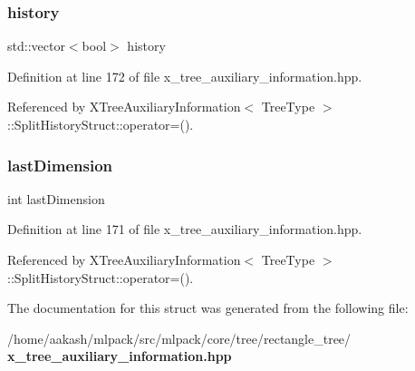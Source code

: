 \subsubsection{history}
{\footnotesize\ttfamily std\+::vector$<$bool$>$ history}



Definition at line 172 of file x\+\_\+tree\+\_\+auxiliary\+\_\+information.\+hpp.



Referenced by X\+Tree\+Auxiliary\+Information$<$ Tree\+Type $>$\+::\+Split\+History\+Struct\+::operator=().

\mbox{\label{structmlpack_1_1tree_1_1XTreeAuxiliaryInformation_1_1SplitHistoryStruct_a6684f26fb0936bb74b60344e7e819b8a}} 
\subsubsection{last\+Dimension}
{\footnotesize\ttfamily int last\+Dimension}



Definition at line 171 of file x\+\_\+tree\+\_\+auxiliary\+\_\+information.\+hpp.



Referenced by X\+Tree\+Auxiliary\+Information$<$ Tree\+Type $>$\+::\+Split\+History\+Struct\+::operator=().



The documentation for this struct was generated from the following file\+:\begin{DoxyCompactItemize}
\item 
/home/aakash/mlpack/src/mlpack/core/tree/rectangle\+\_\+tree/\textbf{ x\+\_\+tree\+\_\+auxiliary\+\_\+information.\+hpp}\end{DoxyCompactItemize}
